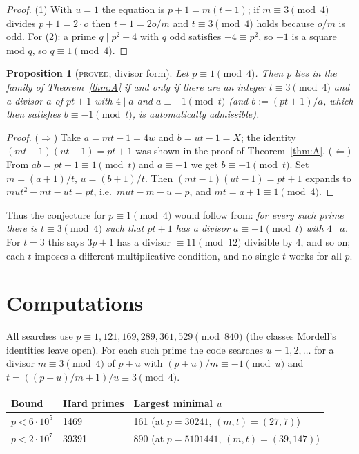 \documentclass[11pt]{article}
\newtheorem{proposition}{Proposition}
\theoremstyle{remark}
\begin{document}
\begin{proof}
(1) With $u=1$ the equation is $p+1=m(t-1)$; if $m\equiv3\pmod 4$ divides $p+1=2\cdot o$ then $t-1=2o/m$ and $t\equiv 3\pmod 4$ holds because $o/m$ is odd. For (2): a prime $q\mid p^2+4$ with $q$ odd satisfies $-4\equiv p^2$, so $-1$ is a square mod $q$, so $q\equiv1\pmod 4$.
\end{proof}

\begin{proposition}[\textsc{proved}; divisor form]\label{prop:B}
Let $p\equiv1\pmod4$. Then $p$ lies in the family of Theorem~\ref{thm:A} if and only if there are an integer $t\equiv3\pmod4$ and a divisor $a$ of $pt+1$ with $4\mid a$ and $a\equiv-1\pmod t$ (and $b:=(pt+1)/a$, which then satisfies $b\equiv-1\pmod t$, is automatically admissible).
\end{proposition}
\begin{proof}
($\Rightarrow$) Take $a=mt-1=4w$ and $b=ut-1=X$; the identity $(mt-1)(ut-1)=pt+1$ was shown in the proof of Theorem~\ref{thm:A}. ($\Leftarrow$) From $ab=pt+1\equiv1\pmod t$ and $a\equiv-1$ we get $b\equiv-1\pmod t$. Set $m=(a+1)/t$, $u=(b+1)/t$. Then $(mt-1)(ut-1)=pt+1$ expands to $mut^2-mt-ut=pt$, i.e.\ $mut-m-u=p$, and $mt=a+1\equiv1\pmod4$.
\end{proof}

\noindent Thus the conjecture for $p\equiv1\pmod 4$ would follow from: \emph{for every such prime there is $t\equiv3\pmod4$ such that $pt+1$ has a divisor $a\equiv-1\pmod t$ with $4\mid a$.} For $t=3$ this says $3p+1$ has a divisor $\equiv 11 \pmod{12}$ divisible by $4$, and so on; each $t$ imposes a different multiplicative condition, and no single $t$ works for all $p$.

\section{Computations}

All searches use $p\equiv 1,121,169,289,361,529\pmod{840}$ (the classes Mordell's identities leave open). For each such prime the code searches $u=1,2,\dots$ for a divisor $m\equiv3\pmod 4$ of $p+u$ with $(p+u)/m\equiv-1\pmod u$ and $t=((p+u)/m+1)/u\equiv3\pmod 4$.

\begin{center}
\begin{tabular}{lll}
\hline
Bound & Hard primes & Largest minimal $u$\\
\hline
$p<6\cdot10^{5}$ & 1469 & 161 (at $p=30241$, $(m,t)=(27,7)$)\\
$p<2\cdot10^{7}$ & 39391 & 890 (at $p=5101441$, $(m,t)=(39,147)$)\\
\hline
\end{tabular}
\end{center}
\end{document}
